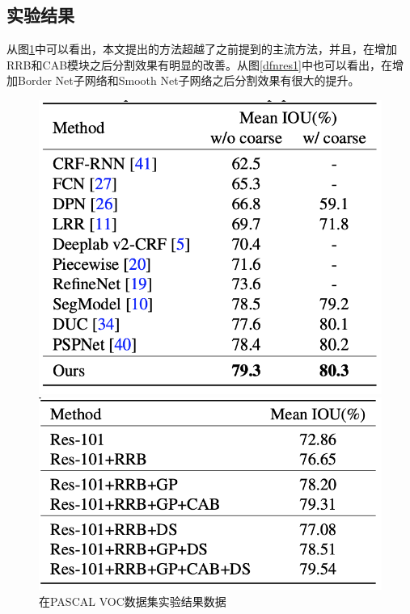\documentclass[cn]{elegantbook}
\begin{document}
\subsection{实验结果}
从图\ref{dfnres2}中可以看出，本文提出的方法超越了之前提到的主流方法，并且，在增加RRB和CAB模块之后分割效果有明显的改善。从图\ref{dfnres1}中也可以看出，在增加Border Net子网络和Smooth Net子网络之后分割效果有很大的提升。
\begin{figure}[!h]
	\centering
	\begin{minipage}[t]{0.48\textwidth}
		\centering
		\includegraphics[width=\textwidth]{images/dfnres1}
	\end{minipage}
	\begin{minipage}[t]{0.48\textwidth}
		\centering
		\includegraphics[width=\textwidth]{images/dfnres2}
	\end{minipage}
	\caption{\label{dfnres2}在PASCAL VOC数据集实验结果数据}
\end{figure}
\end{document}
